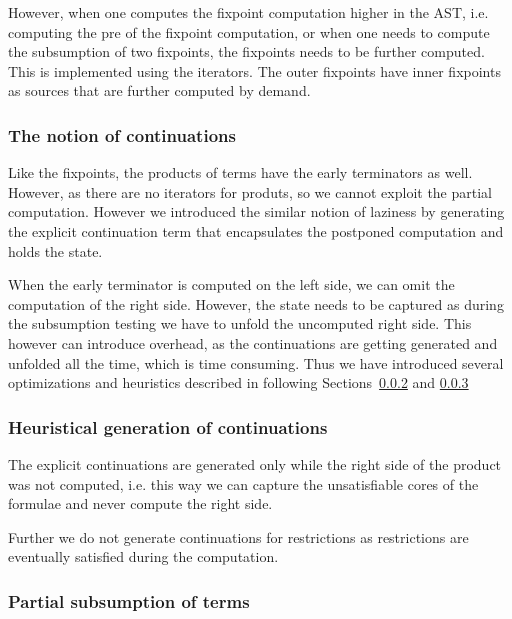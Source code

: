     However, when one computes the fixpoint computation higher in the
    AST, i.e. computing the pre of the fixpoint computation, or when
    one needs to compute the subsumption of two fixpoints, the 
    fixpoints needs to be further computed. This is implemented
    using the iterators. The outer fixpoints have inner fixpoints
    as sources that are further computed by demand.
  
    \subsubsection{The notion of continuations}    
    
    Like the fixpoints, the products of terms have the early 
    terminators as well. However, as there are no iterators for
    produts, so we cannot exploit the partial computation. However
    we introduced the similar notion of laziness by generating the
    explicit continuation term that encapsulates the postponed
    computation and holds the state. 
    
    When the early terminator is computed on the left side, we can
    omit the computation of the right side. However, the state needs
    to be captured as during the subsumption testing we have to
    unfold the uncomputed right side. This however can introduce
    overhead, as the continuations are getting generated and unfolded
    all the time, which is time consuming. Thus we have introduced 
    several optimizations and heuristics described in following
    Sections~\ref{opt:heuristic-cont} and \ref{opt:partial-sub}

    \subsubsection{Heuristical generation of continuations}\label{opt:heuristic-cont}    
    
    The explicit continuations are generated only while the right
    side of the product was not computed, i.e. this way we can
    capture the unsatisfiable cores of the formulae and never 
    compute the right side. 
    
    Further we do not generate continuations for restrictions as
    restrictions are eventually satisfied during the computation.
  
    \subsubsection{Partial subsumption of terms}\label{opt:partial-sub}
    
